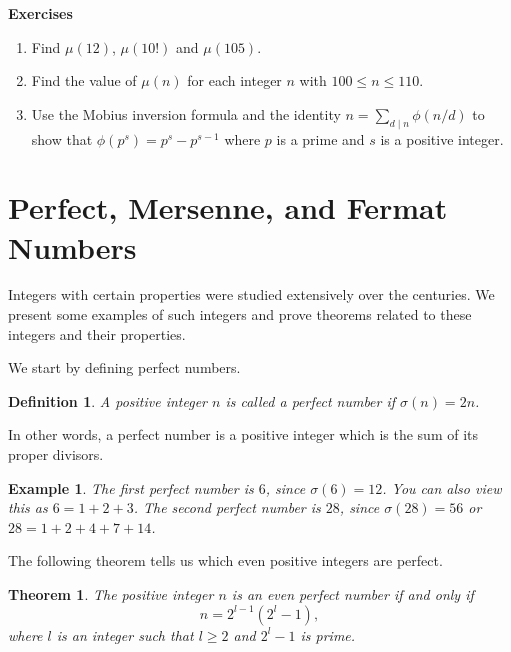 \documentclass[12pt,letterpaper]{book}
\newtheorem{definition}{Definition}
\newtheorem{theorem}{Theorem}
\newtheorem{example}{Example}
\begin{document}
\textbf{Exercises}
\begin{enumerate}
\item{Find $\mu(12)$, $\mu(10!)$ and $\mu(105)$.}\item{Find the
value of $\mu(n)$ for each integer $n$ with $100\leq n\leq
110$.}\item{Use the Mobius inversion formula and the identity
$n=\sum_{d\mid n}\phi(n/d)$ to show that $\phi(p^s)=p^s-p^{s-1}$
where $p$ is a prime and $s$ is a positive integer.}
\end{enumerate}


\newpage

\section{Perfect, Mersenne, and Fermat Numbers}

Integers with certain properties were studied extensively over the
centuries.  We present some examples of such integers and prove
theorems related to these integers and their properties.

\par We start by defining perfect numbers.
\begin{definition}
A positive integer $n$ is called a perfect number if $\sigma(n)=2n$.
\end{definition}

In other words, a perfect number is a positive integer which is the
sum of its proper divisors.

\begin{example}
The first perfect number is $6$, since $\sigma(6)=12$. You can also
view this as $6=1+2+3$. The second perfect number is $28$, since
$\sigma(28)=56$ or  $28=1+2+4+7+14$.
\end{example}

The following theorem tells us which even positive integers are
perfect.

\begin{theorem}\label{perfect}
The positive integer $n$ is an even perfect number if and only if
\begin{equation*}
n=2^{l-1}(2^l-1),
\end{equation*}
where $l$ is an integer such that $l\geq 2$ and $2^l-1$ is prime.
\end{theorem}
\end{document}
